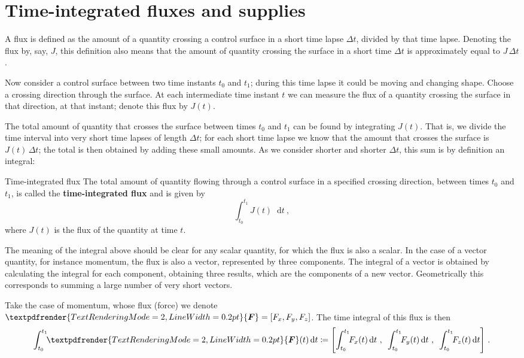 \documentclass[a4paper,12pt,%
onecolumn,oneside,%
british%
]{memoir}
\renewcommand*{\bm}[1]{\textpdfrender{TextRenderingMode=2,LineWidth=0.2pt}{\boldsymbol{#1}}}
\newcommand*{\di}{\mathop{}\!\mathrm{d}}%
\newcommand*{\incr}{\Delta}%
\newcommand*{\defd}{\coloneqq}
\renewcommand*{\|}[1][]{\nonscript\:#1\vert\nonscript\:\mathopen{}}
\newcommand*{\yti}{t_{0}}
\newcommand*{\ytf}{t_{1}}
\newcommand*{\dt}{\di t}
\newcommand*{\Dt}{\incr t}
\newcommand*{\yJ}{J}
\newcommand*{\yF}{\bm{F}}
\begin{document}
\section{Time-integrated fluxes and supplies}
\label{sec:total_flow}

A flux is defined as the amount of a quantity crossing a control surface in a short time lapse $\Dt$, divided by that time lapse. Denoting the flux by, say, $\yJ$, this definition also means that the amount of quantity crossing the surface in a short time $\Dt$ is approximately equal to $\yJ\,\Dt$.

Now consider a control surface between two time instants $\yti$ and $\ytf$; during this time lapse it could be moving and changing shape. Choose a crossing direction through the surface. At each intermediate time instant $t$ we can measure the flux of a quantity crossing the surface in that direction, at that instant; denote this flux by $\yJ(t)$.

The total amount of quantity that crosses the surface between times $\yti$ and $\ytf$ can be found by integrating $\yJ(t)$. That is, we divide the time interval into very short time lapses of length $\Dt$; for each short time lapse we know that the amount that crosses the surface is $\yJ(t)\,\Dt$; the total is then obtained by adding these small amounts. As we consider shorter and shorter $\Dt$, this sum is by definition an integral:
%
\begin{definition}{Time-integrated flux}
The total amount of quantity flowing through a control surface in a specified crossing direction, between times $\yti$ and $\ytf$, is called the \textbf{time-integrated flux} and is given by
  \begin{equation}
    \label{eq:total_flow_integral}
     \int_{\yti}^{\ytf}\!\! \yJ(t)\dt\ ,
   \end{equation}
   where $\yJ(t)$ is the flux of the quantity at time $t$.
\end{definition}

The meaning of the integral above should be clear for any scalar quantity, for which the flux is also a scalar. In the case of a vector quantity, for instance momentum, the flux is also a vector, represented by three components. The integral of a vector is obtained by calculating the integral for each component, obtaining three results, which are the components of a new vector. Geometrically this corresponds to summing a large number of very short vectors.

Take the case of momentum, whose flux (force) we denote $\yF=[F_{x}, F_{y}, F_{z}]$. The time integral of this flux is then
\begin{equation}
  \label{eq:total_flow_integral_vector}
  \int_{\yti}^{\ytf}\!\! \yF(t)\dt \defd
  \Biggl[
  \int_{\yti}^{\ytf}\!\! F_{x}(t)\dt \ ,\enskip
  \int_{\yti}^{\ytf}\!\! F_{y}(t)\dt \ ,\enskip
  \int_{\yti}^{\ytf}\!\! F_{z}(t)\dt
  \Biggr] \ .
\end{equation}
\end{document}
